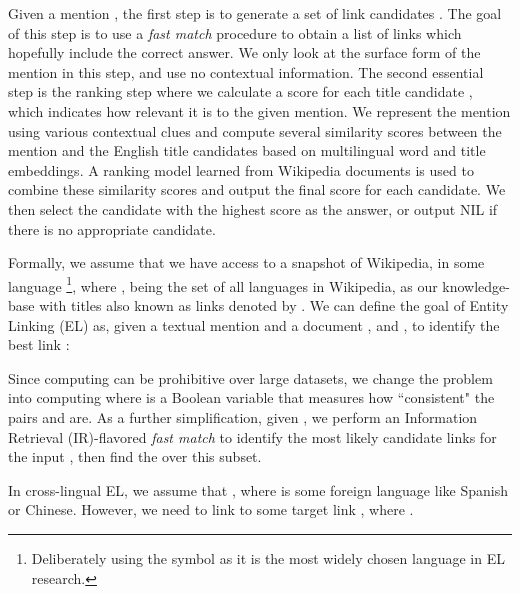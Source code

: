 \documentclass[letterpaper]{article} \usepackage{aaai18}  \usepackage{times}  \usepackage{helvet}  \usepackage{courier}  \usepackage{url}  \usepackage{graphicx}  \frenchspacing  \setlength{\pdfpagewidth}{8.5in}  \setlength{\pdfpageheight}{11in}  \usepackage{latexsym}
\begin{document}
Given a mention , the first step is to generate
a set of link candidates . The goal of this
step is to use a {\em fast match} procedure to obtain a list of links which hopefully include the correct answer. We only look at the surface
form of the mention in this step, and use no contextual
information.
The second essential step is the ranking step where
we calculate a score for each title candidate ,
which indicates how relevant it is to the given mention. We represent the mention using various contextual
clues and compute several similarity scores
between the mention and the English title candidates
based on multilingual word and title embeddings. A
ranking model learned from Wikipedia documents is
used to combine these similarity scores and output
the final score for each candidate. We then select
the candidate with the highest score as the answer,
or output NIL if there is no appropriate candidate.

Formally, we assume that we have access to a snapshot of Wikipedia, in some language \footnote{Deliberately using the symbol  as it is the most widely chosen language in EL research.}, where ,  being the set of all languages in Wikipedia,  as our knowledge-base  with titles also known as links denoted by . We can define the goal of Entity Linking (EL) as, given a textual mention  and a document ,  and , to identify the best link : 

Since computing  can be prohibitive over large datasets, we change the problem into computing 
where  is a Boolean variable that measures how ``consistent" the pairs  and  are. As a further simplification, given , we perform an Information Retrieval (IR)-flavored \textit{fast match} to identify the most likely candidate links  for the input , then find the  over this subset.

In cross-lingual EL, we assume that , where  is some foreign language like Spanish or Chinese. However, we need to link  to some target link , where .
\end{document}

